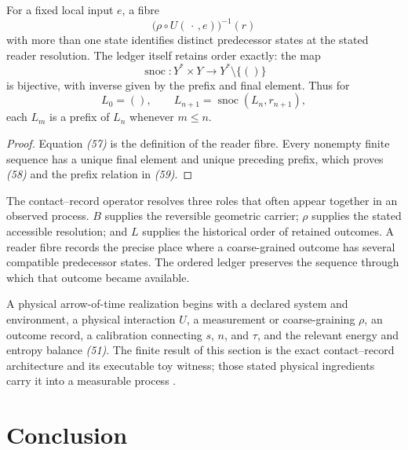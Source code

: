 \begin{proposition}
For a fixed local input $e$, a fibre
\[
\bigl(\rho\circ U(\,\cdot\,,e)\bigr)^{-1}(r)
\tag{57}
\]
with more than one state identifies distinct predecessor states at the stated
reader resolution.  The ledger itself retains order exactly: the map
\[
\operatorname{snoc}:Y^\ast\times Y\longrightarrow
Y^\ast\setminus\{()\}
\tag{58}
\]
is bijective, with inverse given by the prefix and final element.  Thus for
\[
L_0=(),\qquad
L_{n+1}=\operatorname{snoc}(L_n,r_{n+1}),
\tag{59}
\]
each $L_m$ is a prefix of $L_n$ whenever $m\leq n$.
\end{proposition}

\begin{proof}
Equation \emph{(57)} is the definition of the reader fibre.  Every nonempty
finite sequence has a unique final element and unique preceding prefix, which
proves \emph{(58)} and the prefix relation in \emph{(59)}.
\end{proof}

The contact--record operator resolves three roles that often appear together
in an observed process.  $B$ supplies the reversible geometric carrier;
$\rho$ supplies the stated accessible resolution; and $L$ supplies the
historical order of retained outcomes.  A reader fibre records the precise
place where a coarse-grained outcome has several compatible predecessor
states.  The ordered ledger preserves the sequence through which that outcome
became available.

A physical arrow-of-time realization begins with a declared system and
environment, a physical interaction $U$, a measurement or coarse-graining
$\rho$, an outcome record, a calibration connecting $s$, $n$, and $\tau$,
and the relevant energy and entropy balance \emph{(51)}.  The finite result
of this section is the exact contact--record architecture and its executable
toy witness; those stated physical ingredients carry it into a measurable
process \cite{shannon,landauer}.

\section{Conclusion}

